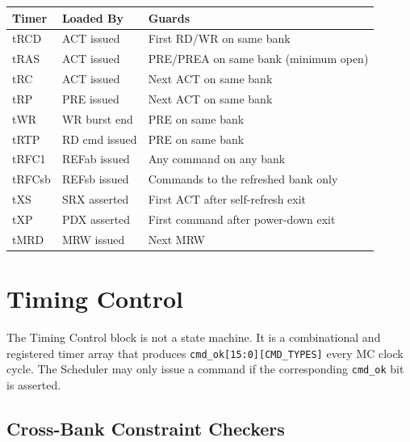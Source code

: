 \documentclass[10pt,a4paper]{article}
\newcommand{\Th}[1]{\cellcolor{cellbg}\textbf{\small #1}}
\newcommand{\RA}{\rowcolor{white}}
\newcommand{\RB}{\rowcolor{altbg}}
\begin{document}
\begin{center}
\begin{tabularx}{0.9\linewidth}{@{} l l X @{}}
\toprule
\Th{Timer} & \Th{Loaded By} & \Th{Guards} \\
\midrule
\RA tRCD & ACT issued & First RD/WR on same bank \\
\RB tRAS & ACT issued & PRE/PREA on same bank (minimum open) \\
\RA tRC & ACT issued & Next ACT on same bank \\
\RB tRP & PRE issued & Next ACT on same bank \\
\RA tWR & WR burst end & PRE on same bank \\
\RB tRTP & RD cmd issued & PRE on same bank \\
\RA tRFC1 & REFab issued & Any command on any bank \\
\RB tRFCsb & REFsb issued & Commands to the refreshed bank only \\
\RA tXS & SRX asserted & First ACT after self-refresh exit \\
\RB tXP & PDX asserted & First command after power-down exit \\
\RA tMRD & MRW issued & Next MRW \\
\bottomrule
\end{tabularx}
\end{center}

\section{Timing Control}

The Timing Control block is not a state machine. It is a combinational and registered timer
array that produces \texttt{cmd\_ok[15:0][CMD\_TYPES]} every MC clock cycle. The Scheduler
may only issue a command if the corresponding \texttt{cmd\_ok} bit is asserted.

\subsection{Cross-Bank Constraint Checkers}
\end{document}
